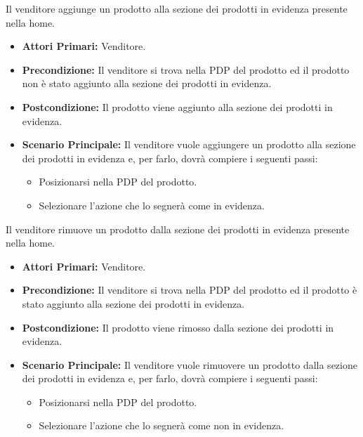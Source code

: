 Il venditore aggiunge un prodotto alla sezione dei prodotti in evidenza presente nella home.
\begin{itemize}
    \item \textbf{Attori Primari:} Venditore.
    \item \textbf{Precondizione:} Il venditore si trova nella PDP del prodotto ed il prodotto non è stato aggiunto alla sezione dei prodotti in evidenza.
    \item \textbf{Postcondizione:} Il prodotto viene aggiunto alla sezione dei prodotti in evidenza. 
    \item \textbf{Scenario Principale:} Il venditore vuole aggiungere un prodotto alla sezione dei prodotti in evidenza e, per farlo, dovrà compiere i seguenti passi:
    \begin{itemize}
        \item Posizionarsi nella PDP del prodotto.
        \item Selezionare l'azione che lo segnerà come in evidenza.
    \end{itemize}
\end{itemize}

Il venditore rimuove un prodotto dalla sezione dei prodotti in evidenza presente nella home.
\begin{itemize}
    \item \textbf{Attori Primari:} Venditore.
    \item \textbf{Precondizione:} Il venditore si trova nella PDP del prodotto ed il prodotto è stato aggiunto alla sezione dei prodotti in evidenza.
    \item \textbf{Postcondizione:} Il prodotto viene rimosso dalla sezione dei prodotti in evidenza. 
    \item \textbf{Scenario Principale:} Il venditore vuole rimuovere un prodotto dalla sezione dei prodotti in evidenza e, per farlo, dovrà compiere i seguenti passi:
    \begin{itemize}
        \item Posizionarsi nella PDP del prodotto.
        \item Selezionare l'azione che lo segnerà come non in evidenza.
    \end{itemize}
\end{itemize}


